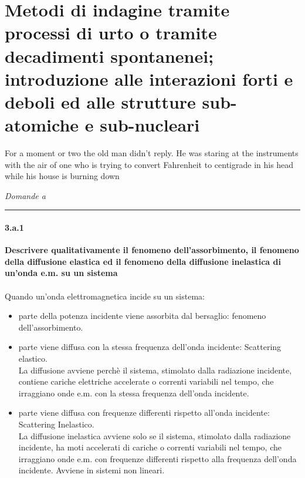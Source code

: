 \documentclass[twoside]{article}
\begin{document}
\section{Metodi di indagine tramite processi di urto o tramite decadimenti spontanenei; introduzione alle interazioni forti e deboli ed alle strutture sub-atomiche e sub-nucleari}
\epigraph{For a moment or two the old man didn't reply. He was staring at the instruments with the air of one who is trying to convert Fahrenheit to centigrade in his head while his house is burning down}{}
\textit{Domande a}\rule{13.7 cm}{0.4pt}

\paragraph{3.a.1}\textbf{Descrivere qualitativamente il fenomeno dell'assorbimento, il fenomeno della
diffusione elastica ed il fenomeno della diffusione inelastica di un'onda e.m. su
un sistema}\\ \\
Quando un'onda elettromagnetica incide su un sistema:
\begin{itemize}
\item parte della potenza incidente viene assorbita dal bersaglio: fenomeno dell'assorbimento.
\item parte viene diffusa con la stessa frequenza dell'onda incidente: Scattering elastico.
\\
La diffusione avviene perchè il sistema, stimolato dalla radiazione
incidente, contiene cariche elettriche accelerate o correnti variabili nel
tempo, che irraggiano onde e.m. con la stessa frequenza dell'onda
incidente.
\item parte viene diffusa con frequenze differenti rispetto all'onda incidente: Scattering Inelastico. \\
La diffusione inelastica avviene solo se il sistema, stimolato dalla
radiazione incidente, ha moti accelerati di cariche o correnti variabili nel
tempo, che irraggiano onde e.m. con frequenze differenti rispetto alla
frequenza dell'onda incidente.
Avviene in sistemi non lineari.
\end{itemize}
\end{document}
